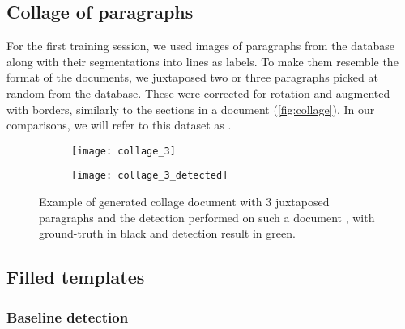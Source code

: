 
	\subsection{Collage of paragraphs}
		For the first training session, we used images of paragraphs from the database along with their segmentations into lines as labels. To make them resemble the format of the documents, we juxtaposed two or three paragraphs picked at random from the database. These were corrected for rotation and augmented with borders, similarly to the sections in a document (\autoref{fig:collage}). In our comparisons, we will refer to this dataset as .


		\begin{figure}
			\centering
			\begin{subfigure}[c]{\textwidth}
				\texttt{[image: collage\_3]}
				\caption{}
				\label{sfig:collage_clean}
			\end{subfigure}

			\begin{subfigure}[c]{\textwidth}
				\texttt{[image: collage\_3\_detected]}
				\caption{}
				\label{sfig:collage_detect}
			\end{subfigure}
			\caption{Example of generated collage document with 3 juxtaposed paragraphs  and the detection performed on such a document , with ground-truth in black and detection result in green.}
			\label{fig:collage}
		\end{figure}


	\subsection{Filled templates}

		\subsubsection{Baseline detection}

